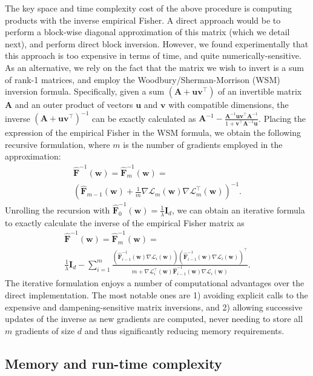 \documentclass[11pt]{article}
\newcommand{\vect}[1]{\mathbf{#1}}
\newcommand{\w}{\mathbf{w}}
\newcommand{\pr}[1]{\left(#1\right)}
\newcommand{\eF}{\widehat{\vect{F}}}
\begin{document}
The key space and time complexity cost of the above procedure is computing products with the inverse empirical Fisher. 
A direct approach would be to perform a block-wise diagonal approximation of this matrix (which we detail next), and perform direct block inversion.
However, we found experimentally that this approach is too expensive in terms of time, and quite numerically-sensitive. 
As an alternative, we rely on the fact that the matrix we wish to invert is a sum of rank-1 matrices, and employ the Woodbury/Sherman-Morrison (WSM) inversion formula. 
Specifically, given a sum $(\vect{A} + \vect{u}\vect{v}^\top)$ of an invertible matrix $\vect{A}$ and an outer product of vectors $\vect{u}$ and $\vect{v}$ with compatible dimensions, the inverse $(\vect{A} + \vect{u}\vect{v}^\top)^{-1}$ can be exactly calculated as $\vect{A}^{-1} - \frac{\vect{A}^{-1}\vect{u}\vect{v}^\top\vect{A}^{-1}}{1+\vect{v}^\top\vect{A}^{-1}\vect{u}}$. Placing the expression of the empirical Fisher in the WSM formula, we obtain the following recursive formulation, where $m$ is the number of gradients employed in the approximation:
\begin{eqnarray*}
    & \eF^{-1}(\w) = \eF^{-1}_m(\w) = \\ & \pr{\eF_{m-1}(\w) + \frac{1}{m} \nabla \mathcal{L}_m(\w) \nabla \mathcal{L}_m^\top(\w)}^{-1}. &
\end{eqnarray*}
\noindent Unrolling the recursion with $\eF^{-1}_0(\w) = \frac{1}{\lambda} \vect{I}_d$, we can obtain an iterative formula to exactly calculate the inverse of the empirical Fisher matrix as
\begin{eqnarray*}
\label{eq:iterative}
    & \eF^{-1}(\w) =  \eF^{-1}_m(\w) = \\ & \frac{1}{\lambda} \vect{I}_d - \sum_{i=1}^{m} \frac{\pr{\eF^{-1}_{i-1}(\w) \nabla \mathcal{L}_i(\w)}\pr{\eF^{-1}_{i-1}(\w) \nabla \mathcal{L}_i(\w)}^\top}{m + \nabla \mathcal{L}_i^\top(\w) \eF^{-1}_{i-1}(\w) \nabla \mathcal{L}_i(\w)}. &
\end{eqnarray*}
The iterative formulation enjoys a number of computational advantages over the direct implementation. The most notable ones are 1) avoiding explicit calls to the expensive and dampening-sensitive matrix inversions, and 2) allowing successive updates of the inverse as new gradients are computed, never needing to store all $m$ gradients of size $d$ and thus significantly reducing memory requirements. 

\subsection{Memory and run-time complexity}
\end{document}
